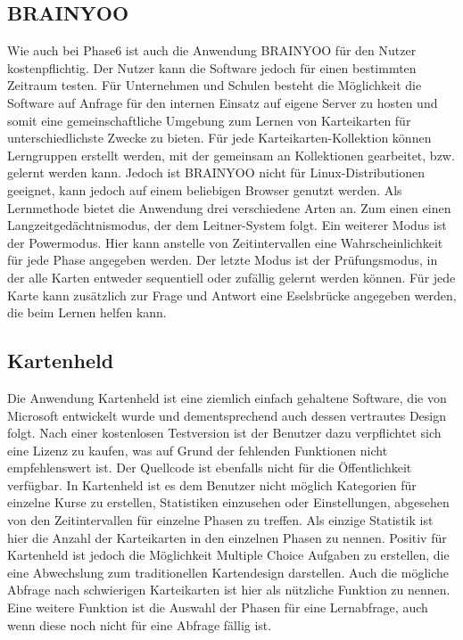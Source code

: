 \subsection{BRAINYOO}
Wie auch bei Phase6 ist auch die Anwendung BRAINYOO \cite{brainyoo} für den Nutzer kostenpflichtig. Der Nutzer kann die Software jedoch für einen bestimmten Zeitraum testen. Für Unternehmen und Schulen besteht die Möglichkeit die Software auf Anfrage für den internen Einsatz auf eigene Server zu hosten und somit eine gemeinschaftliche Umgebung zum Lernen von Karteikarten für unterschiedlichste Zwecke zu bieten. Für jede Karteikarten-Kollektion können Lerngruppen erstellt werden, mit der gemeinsam an Kollektionen gearbeitet, bzw. gelernt werden kann. Jedoch ist BRAINYOO nicht für Linux-Distributionen geeignet, kann jedoch auf einem beliebigen Browser genutzt werden. Als Lernmethode bietet die Anwendung drei verschiedene Arten an. Zum einen einen Langzeitgedächtnismodus, der dem Leitner-System folgt. Ein weiterer Modus ist der Powermodus. Hier kann anstelle von Zeitintervallen eine Wahrscheinlichkeit für jede Phase angegeben werden. Der letzte Modus ist der Prüfungsmodus, in der alle Karten entweder sequentiell oder zufällig gelernt werden können. Für jede Karte kann zusätzlich zur Frage und Antwort eine Eselsbrücke angegeben werden, die beim Lernen helfen kann. 

\subsection{Kartenheld}
Die Anwendung Kartenheld \cite{kartenheld} ist eine ziemlich einfach gehaltene Software, die von Microsoft entwickelt wurde und dementsprechend auch dessen vertrautes Design folgt. Nach einer kostenlosen Testversion ist der Benutzer dazu verpflichtet sich eine Lizenz zu kaufen, was auf Grund der fehlenden Funktionen nicht empfehlenswert ist. Der Quellcode ist ebenfalls nicht für die Öffentlichkeit verfügbar. In Kartenheld ist es dem Benutzer nicht möglich Kategorien für einzelne Kurse zu erstellen, Statistiken einzusehen oder Einstellungen, abgesehen von den Zeitintervallen für einzelne Phasen zu treffen. Als einzige Statistik ist hier die Anzahl der Karteikarten in den einzelnen Phasen zu nennen. Positiv für Kartenheld ist jedoch die Möglichkeit Multiple Choice Aufgaben zu erstellen, die eine Abwechslung zum traditionellen Kartendesign darstellen. Auch die mögliche Abfrage nach schwierigen Karteikarten ist hier als nützliche Funktion zu nennen. Eine weitere Funktion ist die Auswahl der Phasen für eine Lernabfrage, auch wenn diese noch nicht für eine Abfrage fällig ist.

